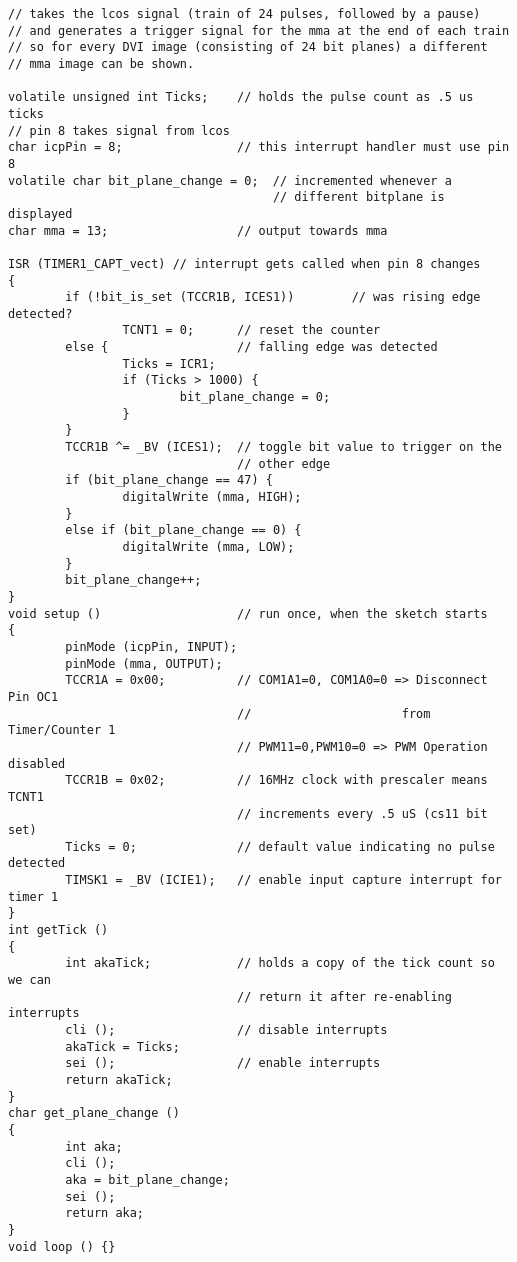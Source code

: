 {\small\label{fig:arduino-vsync}
\begin{verbatim}
// takes the lcos signal (train of 24 pulses, followed by a pause)
// and generates a trigger signal for the mma at the end of each train
// so for every DVI image (consisting of 24 bit planes) a different
// mma image can be shown. 

volatile unsigned int Ticks;    // holds the pulse count as .5 us ticks
// pin 8 takes signal from lcos
char icpPin = 8;                // this interrupt handler must use pin 8
volatile char bit_plane_change = 0;  // incremented whenever a 
                                     // different bitplane is displayed
char mma = 13;                  // output towards mma

ISR (TIMER1_CAPT_vect) // interrupt gets called when pin 8 changes
{
        if (!bit_is_set (TCCR1B, ICES1))        // was rising edge detected?
                TCNT1 = 0;      // reset the counter
        else {                  // falling edge was detected
                Ticks = ICR1;
                if (Ticks > 1000) {
                        bit_plane_change = 0;
                }
        }
        TCCR1B ^= _BV (ICES1);  // toggle bit value to trigger on the
                                // other edge
        if (bit_plane_change == 47) {
                digitalWrite (mma, HIGH);
        }
        else if (bit_plane_change == 0) {
                digitalWrite (mma, LOW);
        }
        bit_plane_change++;
}
void setup ()                   // run once, when the sketch starts
{
        pinMode (icpPin, INPUT);
        pinMode (mma, OUTPUT);
        TCCR1A = 0x00;          // COM1A1=0, COM1A0=0 => Disconnect Pin OC1
                                //                     from Timer/Counter 1
                                // PWM11=0,PWM10=0 => PWM Operation disabled
        TCCR1B = 0x02;          // 16MHz clock with prescaler means TCNT1
                                // increments every .5 uS (cs11 bit set)
        Ticks = 0;              // default value indicating no pulse detected
        TIMSK1 = _BV (ICIE1);   // enable input capture interrupt for timer 1
}
int getTick ()
{
        int akaTick;            // holds a copy of the tick count so we can
                                // return it after re-enabling interrupts
        cli ();                 // disable interrupts
        akaTick = Ticks;
        sei ();                 // enable interrupts
        return akaTick;
}
char get_plane_change ()
{
        int aka;
        cli ();
        aka = bit_plane_change;
        sei ();
        return aka;
}
void loop () {}                 
\end{verbatim}
}

